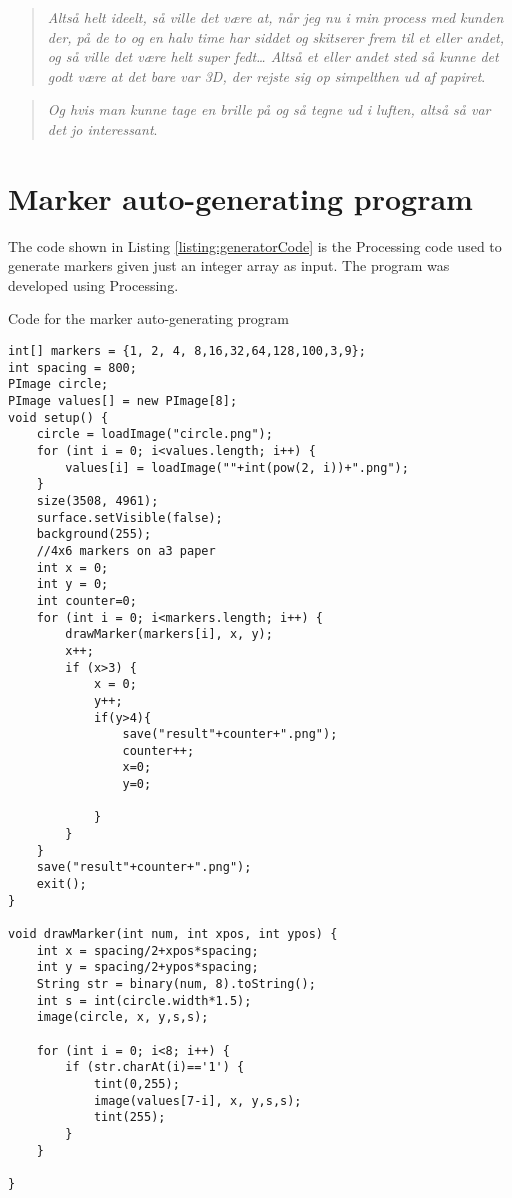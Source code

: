 \begin{quote}
	\textit{Altså helt ideelt, så ville det være at, når jeg nu i min process med kunden der, på de to og en halv time har siddet og skitserer frem til et eller andet, og så ville det være helt super fedt… Altså et eller andet sted så kunne det godt være at det bare var 3D, der rejste sig op simpelthen ud af papiret}\label{quote:expertIdeas3Danish}.\\
\end{quote}

\begin{quote}
	\textit{Og hvis man kunne tage en brille på og så tegne ud i luften, altså så var det jo interessant}\label{quote:expertIdeas4Danish}.\\
\end{quote}



\section*{Marker auto-generating program}
The code shown in Listing \ref{listing:generatorCode} is the Processing code used to generate markers given just an integer array as input. The program was developed using Processing.

\begin{listing}[H]
	\caption{Code for the marker auto-generating program}
	\label{listing:generatorCode}
	\begin{verbatim}
int[] markers = {1, 2, 4, 8,16,32,64,128,100,3,9};
int spacing = 800;
PImage circle;
PImage values[] = new PImage[8];
void setup() {
	circle = loadImage("circle.png");
	for (int i = 0; i<values.length; i++) {
		values[i] = loadImage(""+int(pow(2, i))+".png");
	}
	size(3508, 4961);
	surface.setVisible(false);
	background(255);
	//4x6 markers on a3 paper
	int x = 0;
	int y = 0;
	int counter=0;
	for (int i = 0; i<markers.length; i++) {
		drawMarker(markers[i], x, y);
		x++;
		if (x>3) {
			x = 0;
			y++;
			if(y>4){
				save("result"+counter+".png");
				counter++;
				x=0;
				y=0;
				
			}
		}
	}
	save("result"+counter+".png");
	exit();
}

void drawMarker(int num, int xpos, int ypos) {
	int x = spacing/2+xpos*spacing;
	int y = spacing/2+ypos*spacing;
	String str = binary(num, 8).toString();
	int s = int(circle.width*1.5);
	image(circle, x, y,s,s);
	
	for (int i = 0; i<8; i++) {
		if (str.charAt(i)=='1') {
			tint(0,255);
			image(values[7-i], x, y,s,s);
			tint(255);
		}
	}
	
}
	\end{verbatim}
\end{listing}

